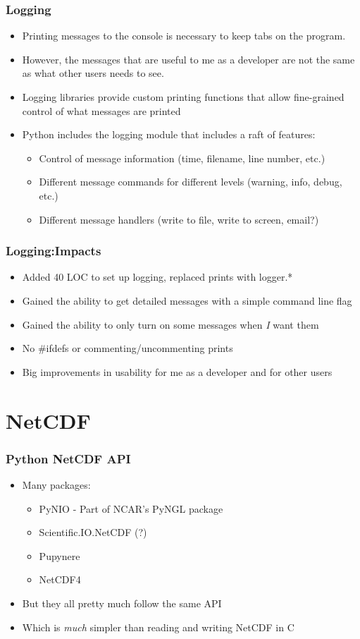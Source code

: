 \documentclass[red, hyperref={pdfpagelabels=false}]{beamer}
\begin{document}
\begin{frame}
  \frametitle{Logging}
  \begin{itemize}
    \item Printing messages to the console is necessary to keep tabs on the program.
    \item However, the messages that are useful to me as a developer are not the
      same as what other users needs to see.
    \item Logging libraries provide custom printing functions that allow fine-grained
      control of what messages are printed
    \item Python includes the logging module that includes a raft of features:
    \begin{itemize}
      \item Control of message information (time, filename, line number, etc.)
      \item Different message commands for different levels (warning, info, debug, etc.)
      \item Different message handlers (write to file, write to screen, email?)
    \end{itemize}
  \end{itemize}
\end{frame}

\begin{frame}
  \frametitle{Logging:Impacts}
  \begin{itemize}
    \item Added 40 LOC to set up logging, replaced prints with logger.*
    \item Gained the ability to get detailed messages with a simple command line flag
    \item Gained the ability to only turn on some messages when \emph{I} want them
    \item No \#ifdefs or commenting/uncommenting prints
    \item Big improvements in usability for me as a developer and for other users
  \end{itemize}
\end{frame}

\section{NetCDF}
\begin{frame}
  \frametitle{Python NetCDF API}
  \begin{itemize}
    \item Many packages:
    \begin{itemize}
      \item PyNIO - Part of NCAR's PyNGL package
      \item Scientific.IO.NetCDF (?)
      \item Pupynere
      \item NetCDF4
    \end{itemize}
    \item But they all pretty much follow the same API
    \item Which is \emph{much} simpler than reading and writing NetCDF in C
  \end{itemize}
\end{frame}
\end{document}
